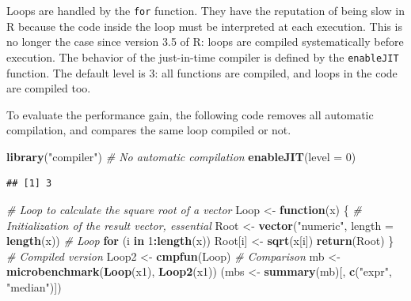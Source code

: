 \documentclass[
  12pt,
  american,
  a4paper,
  extrafontsizes,onecolumn,openright
  ]{memoir}
\newenvironment{Shaded}{\begin{snugshade}}{\end{snugshade}}
\newcommand{\AttributeTok}[1]{\textcolor[rgb]{0.13,0.29,0.53}{#1}}
\newcommand{\CommentTok}[1]{\textcolor[rgb]{0.56,0.35,0.01}{\textit{#1}}}
\newcommand{\ControlFlowTok}[1]{\textcolor[rgb]{0.13,0.29,0.53}{\textbf{#1}}}
\newcommand{\DecValTok}[1]{\textcolor[rgb]{0.00,0.00,0.81}{#1}}
\newcommand{\FunctionTok}[1]{\textcolor[rgb]{0.13,0.29,0.53}{\textbf{#1}}}
\newcommand{\NormalTok}[1]{#1}
\newcommand{\OtherTok}[1]{\textcolor[rgb]{0.56,0.35,0.01}{#1}}
\newcommand{\SpecialCharTok}[1]{\textcolor[rgb]{0.81,0.36,0.00}{\textbf{#1}}}
\newcommand{\StringTok}[1]{\textcolor[rgb]{0.31,0.60,0.02}{#1}}
\newlength{\rf}
\begin{document}
Loops are handled by the \texttt{for} function.
They have the reputation of being slow in R because the code inside the loop must be interpreted at each execution.
This is no longer the case since version 3.5 of R: loops are compiled systematically before execution.
The behavior of the just-in-time compiler is defined by the \texttt{enableJIT} function.
The default level is 3: all functions are compiled, and loops in the code are compiled too.

To evaluate the performance gain, the following code removes all automatic compilation, and compares the same loop compiled or not.

\scriptsize

\begin{Shaded}
\begin{Highlighting}[]
\FunctionTok{library}\NormalTok{(}\StringTok{"compiler"}\NormalTok{)}
\CommentTok{\# No automatic compilation}
\FunctionTok{enableJIT}\NormalTok{(}\AttributeTok{level =} \DecValTok{0}\NormalTok{)}
\end{Highlighting}
\end{Shaded}

\begin{verbatim}
## [1] 3
\end{verbatim}

\begin{Shaded}
\begin{Highlighting}[]
\CommentTok{\# Loop to calculate the square root of a vector}
\NormalTok{Loop }\OtherTok{\textless{}{-}} \ControlFlowTok{function}\NormalTok{(x) \{}
    \CommentTok{\# Initialization of the result vector, essential}
\NormalTok{    Root }\OtherTok{\textless{}{-}} \FunctionTok{vector}\NormalTok{(}\StringTok{"numeric"}\NormalTok{, }\AttributeTok{length =} \FunctionTok{length}\NormalTok{(x))}
    \CommentTok{\# Loop}
    \ControlFlowTok{for}\NormalTok{ (i }\ControlFlowTok{in} \DecValTok{1}\SpecialCharTok{:}\FunctionTok{length}\NormalTok{(x)) Root[i] }\OtherTok{\textless{}{-}} \FunctionTok{sqrt}\NormalTok{(x[i])}
    \FunctionTok{return}\NormalTok{(Root)}
\NormalTok{\}}
\CommentTok{\# Compiled version}
\NormalTok{Loop2 }\OtherTok{\textless{}{-}} \FunctionTok{cmpfun}\NormalTok{(Loop)}
\CommentTok{\# Comparison}
\NormalTok{mb }\OtherTok{\textless{}{-}} \FunctionTok{microbenchmark}\NormalTok{(}\FunctionTok{Loop}\NormalTok{(x1), }\FunctionTok{Loop2}\NormalTok{(x1))}
\NormalTok{(mbs }\OtherTok{\textless{}{-}} \FunctionTok{summary}\NormalTok{(mb)[, }\FunctionTok{c}\NormalTok{(}\StringTok{"expr"}\NormalTok{, }\StringTok{"median"}\NormalTok{)])}
\end{Highlighting}
\end{Shaded}
\end{document}
